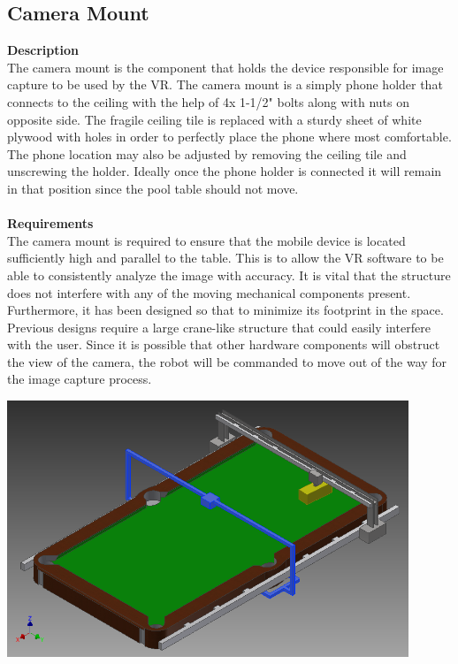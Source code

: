 \documentclass[titlepage]{article}
\begin{document}
\begin{center}
\begin{center}
\begin{center}
\begin{center}
\begin{center}
\begin{center}
\begin{center}
\begin{center}
\subsection{Camera Mount}
\textbf{Description}\\
The camera mount is the component that holds the device responsible for image capture to be used by the VR. The camera mount is a simply phone holder that connects to the ceiling with the help of 4x 1-1/2" bolts along with nuts on opposite side. The fragile ceiling tile is replaced with a sturdy sheet of white plywood with holes in order to perfectly place the phone where most comfortable. The phone location may also be adjusted by removing the ceiling tile and unscrewing the holder. Ideally once the phone holder is connected it will remain in that position since the pool table should not move.\\\\
\textbf{Requirements}\\
The camera mount is required to ensure that the mobile device is located sufficiently high and parallel to the table. This is to allow the VR software to be able to consistently analyze the image with accuracy. It is vital that the structure does not interfere with any of the moving mechanical components present. Furthermore, it has been designed so that to minimize its footprint in the space. Previous designs require a large crane-like structure that could easily interfere with the user. Since it is possible that other hardware components will obstruct the view of the camera, the robot will be commanded to move out of the way for the image capture process.
\begin{center}
	\includegraphics[width = 0.9\textwidth]{cameraMountYAxis.png}
\label{fig:cameraMount}
\end{center}






\end{center}
\end{center}
\end{center}
\end{center}
\end{center}
\end{center}
\end{center}
\end{center}
\end{document}
